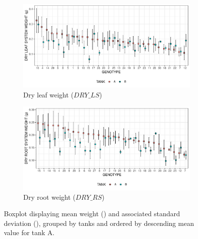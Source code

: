 \begin{figure}
\centering
	\begin{subfigure}[t]{\textwidth}
	\label{fig:desc_stat_DRY_LS}
		\centering
		\includegraphics[width = \textwidth]{../../Figures/DRY_LS_summary_plot.pdf}
		\caption{Dry leaf weight ($DRY\_LS$)}
			\end{subfigure}

	\begin{subfigure}[t]{\textwidth}
		\centering
		\includegraphics[width = \textwidth]{../../Figures/DRY_RS_summary_plot.pdf}
		\caption{Dry root weight ($DRY\_RS$)}
	\end{subfigure}
	\caption[Boxplot of the mean weight and associated standard deviation]{Boxplot displaying mean weight (\protect\emptysquare) and associated standard deviation (\protect\blackline), grouped by tanks and ordered by descending mean value for tank A.}
\end{figure}

